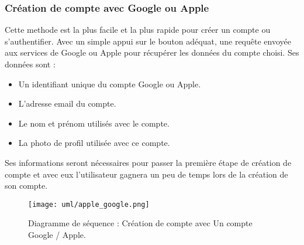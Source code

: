 \subsubsection{Création de compte avec Google ou Apple}
Cette methode est la plus facile et la plus rapide pour créer un compte ou s'authentifier. Avec un simple appui sur le bouton adéquat, une requête envoyée aux services de Google ou Apple pour récupérer les données du compte choisi. Ses données sont :
\begin{itemize}
    \item Un identifiant unique du compte Google ou Apple.
    \item L'adresse email du compte.
    \item Le nom et prénom utilisés avec le compte.
    \item La photo de profil utilisée avec ce compte.
\end{itemize}
Ses informations seront nécessaires pour passer la première étape de création de compte et avec eux l'utilisateur gagnera un peu de temps lors de la création de son compte.
\vspace{1cm}
\begin{figure}[H]
    \centering
    \texttt{[image: uml/apple\_google.png]}
    \vspace{1cm}
    \caption{Diagramme de séquence : Création de compte avec Un compte Google / Apple.}
    \label{fig:seq_register_apple_google}
\end{figure}
